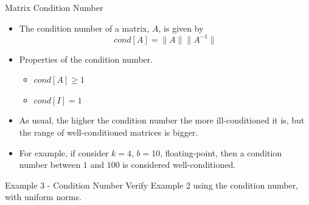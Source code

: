 \documentclass[12pt]{beamer}
\begin{document}
\begin{frame}{Matrix Condition Number}

\begin{itemize}

\item{The condition number of a matrix, $A$, is given by 
\[cond[A]= \|A\|\|A^{-1}\|\]}
\item{Properties of the condition number.}
\begin{itemize}
\item{$cond[A] \geq 1$}
\item{$cond[I]=1$}
\end{itemize}
\item{As usual, the higher the condition number the more ill-conditioned it is, but the range of well-conditioned matrices is bigger.}
\item{For example, if consider $k=4$, $b=10$, floating-point, then a condition number between $1$ and $100$ is considered well-conditioned.}
\end{itemize}
\end{frame}

\begin{frame}{Example 3 - Condition Number}
Verify Example 2 using the condition number, with uniform norms.

\vspace{3 in}
\end{frame} 
\end{document}
